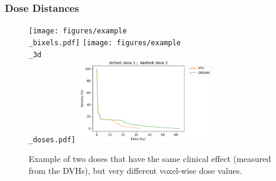 \documentclass{beamer}
\begin{document}
	\begin{frame}
		\frametitle{Dose Distances}
		
		\begin{figure}
			\vspace{-0.5cm}
			\texttt{[image: figures/example\\\_bixels.pdf]}
			\texttt{[image: figures/example\\\_3d\\\_doses.pdf]}
			\vspace{-0.3cm}
			\includegraphics[width=6cm]{figures/example_dvh.pdf}
			
			\caption{Example of two doses that have the same clinical effect (measured from the DVHs), but very different voxel-wise dose values.}
		\end{figure}
		
	\end{frame}
	
	
\end{document}
